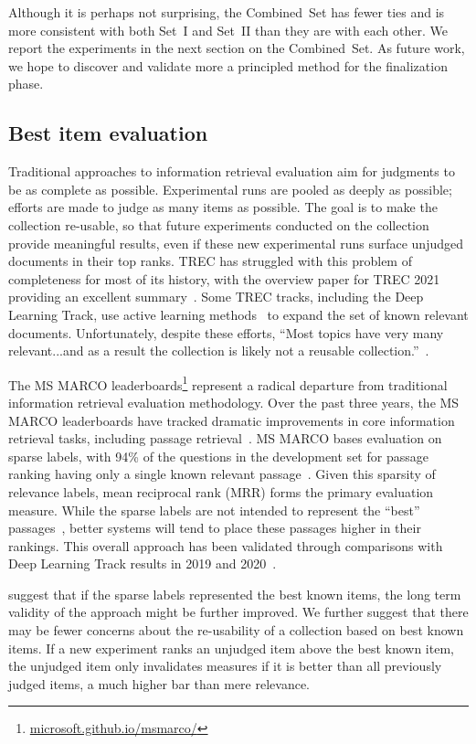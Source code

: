 Although it is perhaps not surprising, the Combined~Set has fewer ties and is more consistent with both Set~I and Set~II than they are with each other. We report the experiments in the next section on the Combined~Set. As future work, we hope to discover and validate more a principled method for the finalization phase.

\subsection{Best item evaluation}

Traditional approaches to information retrieval evaluation aim for judgments to be as complete as possible. Experimental runs are pooled as deeply as possible; efforts are made to judge as many items as possible. The goal is to make the collection re-usable, so that future experiments conducted on the collection provide meaningful results, even if these new experimental runs surface unjudged documents in their top ranks\cite{bpref, incomplete}. TREC has struggled with this problem of completeness for most of its history, with the overview paper for TREC 2021 providing an excellent summary~\cite{TREC21}. Some TREC tracks, including the Deep Learning Track, use active learning methods~\cite{hical} to expand the set of known relevant documents. Unfortunately, despite these efforts, ``Most topics have very many relevant...and as a result the collection is likely not a reusable collection.''~\cite{TREC21}.

The MS MARCO leaderboards\footnote{\url{microsoft.github.io/msmarco/}} represent a radical departure from traditional information retrieval evaluation methodology. Over the past three years, the MS MARCO leaderboards have tracked dramatic improvements in core information retrieval tasks, including passage retrieval~\cite{marco21full}. MS MARCO bases evaluation on sparse labels, with 94\% of the questions in the development set for passage ranking having only a single known relevant passage~\cite{avyc21}. Given this sparsity of relevance labels, mean reciprocal rank (MRR) forms the primary evaluation measure. While the sparse labels are not intended to represent the ``best'' passages~\cite{DL21}, better systems will tend to place these passages higher in their rankings. This overall approach has been validated through comparisons with Deep Learning Track results in 2019 and 2020~\cite{marco21full}.

\citet{avyc21} suggest that if the sparse labels represented the best known items, the long term validity of the approach might be further improved. We further suggest that there may be fewer concerns about the re-usability of a collection based on best known items. If a new experiment ranks an unjudged item above the best known item, the unjudged item only invalidates measures if it is better than all previously judged items, a much higher bar than mere relevance.

